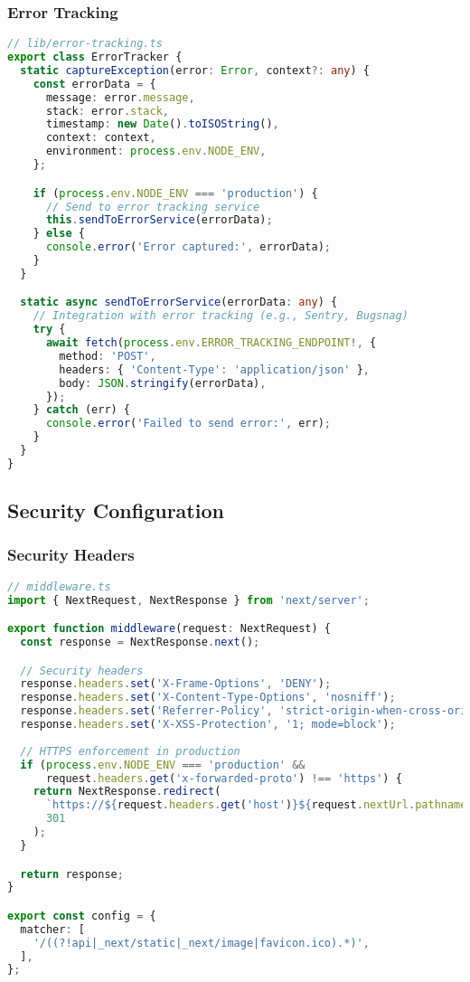 \subsubsection{Error Tracking}

\begin{lstlisting}[language=TypeScript, caption=Error Tracking Setup]
// lib/error-tracking.ts
export class ErrorTracker {
  static captureException(error: Error, context?: any) {
    const errorData = {
      message: error.message,
      stack: error.stack,
      timestamp: new Date().toISOString(),
      context: context,
      environment: process.env.NODE_ENV,
    };

    if (process.env.NODE_ENV === 'production') {
      // Send to error tracking service
      this.sendToErrorService(errorData);
    } else {
      console.error('Error captured:', errorData);
    }
  }

  static async sendToErrorService(errorData: any) {
    // Integration with error tracking (e.g., Sentry, Bugsnag)
    try {
      await fetch(process.env.ERROR_TRACKING_ENDPOINT!, {
        method: 'POST',
        headers: { 'Content-Type': 'application/json' },
        body: JSON.stringify(errorData),
      });
    } catch (err) {
      console.error('Failed to send error:', err);
    }
  }
}
\end{lstlisting}

\subsection{Security Configuration}

\subsubsection{Security Headers}

\begin{lstlisting}[language=TypeScript, caption=Security Middleware]
// middleware.ts
import { NextRequest, NextResponse } from 'next/server';

export function middleware(request: NextRequest) {
  const response = NextResponse.next();

  // Security headers
  response.headers.set('X-Frame-Options', 'DENY');
  response.headers.set('X-Content-Type-Options', 'nosniff');
  response.headers.set('Referrer-Policy', 'strict-origin-when-cross-origin');
  response.headers.set('X-XSS-Protection', '1; mode=block');
  
  // HTTPS enforcement in production
  if (process.env.NODE_ENV === 'production' && 
      request.headers.get('x-forwarded-proto') !== 'https') {
    return NextResponse.redirect(
      `https://${request.headers.get('host')}${request.nextUrl.pathname}`,
      301
    );
  }

  return response;
}

export const config = {
  matcher: [
    '/((?!api|_next/static|_next/image|favicon.ico).*)',
  ],
};
\end{lstlisting}

